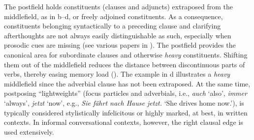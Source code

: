 \documentclass[output=paper]{langscibook}
\begin{document}
\begin{sloppypar}
The postfield holds constituents (clauses and adjuncts) extraposed from the middlefield, as in b--d, or freely adjoined constituents. As a consequence, constituents belonging syntactically to a preceding clause and clarifying afterthoughts are not always easily distinguishable as such, especially when prosodic cues are missing (see various papers in \citealt{Vinckel-Roisin2015}). The postfield provides the canonical area for subordinate clauses and otherwise \textit{heavy} constituents. Shifting them out of the middlefield reduces the distance between discontinuous parts of verbs, thereby easing memory load (\citealt{Haider2010, Imo2016, Proske2015}). The example in d illustrates a \textit{heavy} middlefield since the adverbial clause has not been extraposed. At the same time, postposing “lightweights” (focus particles and adverbials, i.e., \textit{auch} ‘also’, \textit{immer} ‘always’, \textit{jetzt} ‘now’, e.g., \textit{Sie fährt nach Hause jetzt.} ‘She drives home now.’), is typically considered stylistically infelicitous or highly marked, at best, in written contexts. In informal conversational contexts, however, the right clausal edge is used extensively.
\end{sloppypar}
\end{document}
